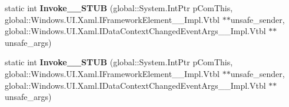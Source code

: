 \begin{DoxyCompactItemize}
static int {\bfseries Invoke\+\_\+\+\_\+\+S\+T\+UB} (global\+::\+System.\+Int\+Ptr p\+Com\+This, global\+::\+Windows.\+U\+I.\+Xaml.\+I\+Framework\+Element\+\_\+\+\_\+\+Impl.\+Vtbl $\ast$$\ast$unsafe\+\_\+sender, global\+::\+Windows.\+U\+I.\+Xaml.\+I\+Data\+Context\+Changed\+Event\+Args\+\_\+\+\_\+\+Impl.\+Vtbl $\ast$$\ast$unsafe\+\_\+args)
\item 
\mbox{\label{struct_windows_1_1_foundation_1_1_typed_event_handler___a___windows___u_i___xaml___framework_ele0f0aa82fcf85c345ad8a6f22953a8130_aff537680bb5472719a42f61d44c804c3}} 
static int {\bfseries Invoke\+\_\+\+\_\+\+S\+T\+UB} (global\+::\+System.\+Int\+Ptr p\+Com\+This, global\+::\+Windows.\+U\+I.\+Xaml.\+I\+Framework\+Element\+\_\+\+\_\+\+Impl.\+Vtbl $\ast$$\ast$unsafe\+\_\+sender, global\+::\+Windows.\+U\+I.\+Xaml.\+I\+Data\+Context\+Changed\+Event\+Args\+\_\+\+\_\+\+Impl.\+Vtbl $\ast$$\ast$unsafe\+\_\+args)
\end{DoxyCompactItemize}
